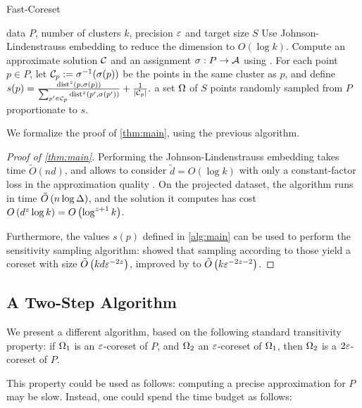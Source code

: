 \begin{algorithm}[tb]
   \caption{Fast-Coreset}
   \label{alg:main}
\begin{algorithmic}
    data $P$, number of clusters $k$, precision $\varepsilon$ and target size $S$
   \STATE Use Johnson-Lindenstrauss embedding to reduce the dimension to $O(\log k)$.
   \STATE Compute an approximate solution $\mathcal C$ and an assignment $\sigma : P \rightarrow \mathcal A$ using \fkmeans.
   \STATE For each point $p \in P$, let $\mathcal C_p := \sigma^{-1}(\sigma(p))$ be the points in the same cluster as $p$, and define 
   $s(p) = \frac{\operatorname{dist}^z(p, \sigma(p))}{\sum_{p' \in \mathcal C_p} \operatorname{dist}^z(p', \sigma(p'))} + \frac{1}{|\mathcal C_p|}.$
    a set $\Omega$ of $S$ points randomly sampled from $P$ proportionate to $s$.
\end{algorithmic}
\end{algorithm}


We formalize the proof of \cref{thm:main}, using the previous algorithm.

\begin{proof}[Proof of \cref{thm:main}]
Performing the Johnson-Lindenstrauss embedding takes time $\tilde O(nd)$, and allows to consider $\tilde d=O(\log k)$ with only a constant-factor loss in the approximation quality  \cite{makarychev2019performance}. 
On the projected dataset, the algorithm \fkmeans runs in time $\tilde O\left( n \log \Delta\right)$, and the solution it computes has cost $O\left( d^z \log k\right) = O\left(\log^{z+1} k\right)$. 

Furthermore, the values $s(p)$ defined in \cref{alg:main} can be used to perform the sensitivity sampling algorithm: \cite{FeldmanL11} showed that sampling according to those yield a coreset with size $\tilde O \left( k d \varepsilon^{-2z}\right)$, improved by \cite{HuangV20} to $\tilde O \left( k \varepsilon^{-2z -2} \right)$.
\end{proof}



\subsection{A Two-Step Algorithm}
We present a different algorithm, based on the following standard transitivity property: if $\Omega_1$ is an $\varepsilon$-coreset of $P$, and $\Omega_2$ an $\varepsilon$-coreset of $\Omega_1$, then $\Omega_2$ is a $2\varepsilon$-coreset of $P$.

This property could be used as follows: computing a precise approximation for $P$ may be slow. Instead, one could spend the time budget as follows:

